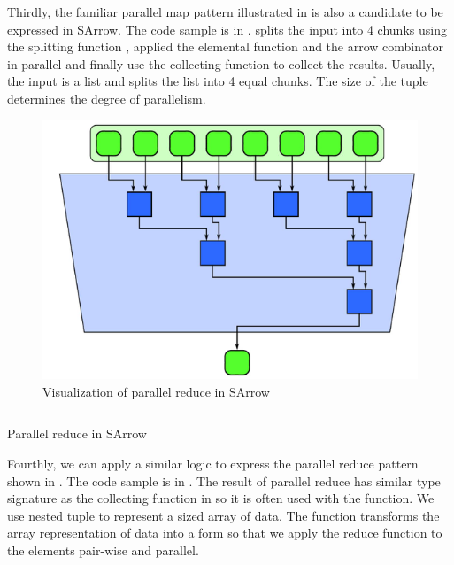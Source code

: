 Thirdly, the familiar parallel map pattern illustrated in  is also a candidate to be expressed in SArrow. The code sample is in .  splits the input  into 4 chunks using the splitting function , applied the elemental function  and the arrow combinator \hask{***} in parallel and finally use the collecting function  to collect the results. Usually, the input  is a list and  splits the list into 4 equal chunks. The size of the tuple determines the degree of parallelism.

\begin{figure}[ht]
    \centering 
    \includegraphics{arrow/preduc.png}
    \caption{Visualization of parallel reduce in SArrow \cite{mccoolStructuredParallelPrograming2012}}
    \label{arrow:fig:preduc}
\end{figure}
\begin{listing}[ht]
    \inputminted{Haskell}{arrow/preduc.hs} 
    \caption{Parallel reduce in SArrow}
    \label{arrow:code:preduc}
\end{listing}
Fourthly, we can apply a similar logic to express the parallel reduce pattern shown in . The code sample is in . The result of parallel reduce has similar type signature as the collecting function in  so it is often used with the  function. We use nested tuple  to represent a sized array of data. The  function transforms the array representation of data into a form so that we apply the reduce function  to the elements pair-wise and parallel.

